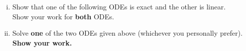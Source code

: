 \documentclass[10pt,twoside,sfsidenotes]{tufte-handout}
\begin{document}
\clearpage
\begin{question}
    \begin{enumerate}[(i)]
        \item Show that one of the following ODEs is exact and the other is linear. \\ Show your work for \textbf{both} ODEs.
            \begin{fullwidth}
            \end{fullwidth}
            \vfill
        \item 
            \begin{fullwidth}
                Solve \textbf{one} of the two ODEs given above (whichever you personally prefer). \textbf{Show your work.}
            \end{fullwidth}
            \vfill
    \end{enumerate}
\end{question}
\end{document}
